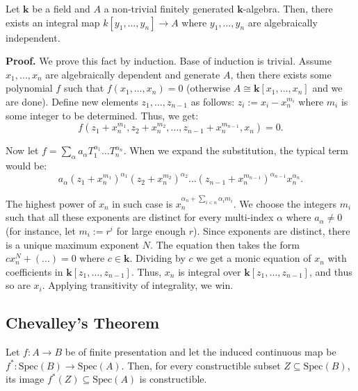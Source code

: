 \documentclass{template}
\begin{document}
\begin{lemma}
    Let $\mathbf{k}$ be a field and $A$ a non-trivial finitely generated
    $\mathbf{k}$-algebra. Then, there exists an integral map $k[y_1,\dots,y_n]
    \to A$ where $y_1,\dots,y_n$ are algebraically independent.
\end{lemma}

\textbf{Proof.} We prove this fact by induction. Base of induction is trivial.
Assume $x_1,\dots,x_n$ are algebraically dependent and generate $A$, then there
exists some polynomial $f$ such that $f(x_1,\dots,x_n)=0$ (otherwise $A \cong
\mathbf{k}[x_1,\dots,x_n]$ and we are done). Define new elements
$z_1,\dots,z_{n-1}$ as follows: $z_i := x_i - x_n^{m_i}$ where $m_i$ is some
integer to be determined. Thus, we get:
\begin{equation*}
    f(z_1+x_n^{m_1},z_2+x_n^{m_2},\dots,z_{n-1}+x_n^{m_{n-1}},x_n) = 0.
\end{equation*}

Now let $f=\sum_{\alpha}a_{\alpha}T_1^{\alpha_1}\dots T_n^{\alpha_n}$. When 
we expand the substitution, the typical term would be:
\begin{equation*}
    a_{\alpha}(z_1+x_n^{m_1})^{\alpha_1}(z_2+x_n^{m_2})^{\alpha_2}\dots (z_{n-1}+x_n^{m_{n-1}})^{\alpha_{n-1}}x_n^{\alpha_n}.
\end{equation*}

The highest power of $x_n$ in such case is $x_n^{\alpha_n + \sum_{i<n}\alpha_i
m_i}$. We choose the integers $m_i$ such that all these exponents are distinct
for every multi-index $\alpha$ where $a_{\alpha} \neq 0$ (for instance, let $m_i
:= r^i$ for large enough $r$). Since exponents are distinct, there is a unique
maximum exponent $N$. The equation then takes the form $cx_n^N + (\dots) = 0$
where $c \in \mathbf{k}$. Dividing by $c$ we get a monic equation of $x_n$ with
coefficients in $\mathbf{k}[z_1,\dots,z_{n-1}]$. Thus, $x_n$ is integral over
$\mathbf{k}[z_1,\dots,z_{n-1}]$, and thus so are $x_i$. Applying transitivity of
integrality, we win.

\subsection{Chevalley's Theorem}

\begin{theorem}
    Let $f: A \to B$ be of finite presentation and let the induced continuous
    map be $f^*: \text{Spec}(B) \to \text{Spec}(A)$. Then, for every
    constructible subset $Z \subseteq \text{Spec}(B)$, its image $f^*(Z)
    \subseteq \text{Spec}(A)$ is constructible.
\end{theorem}
\end{document}
